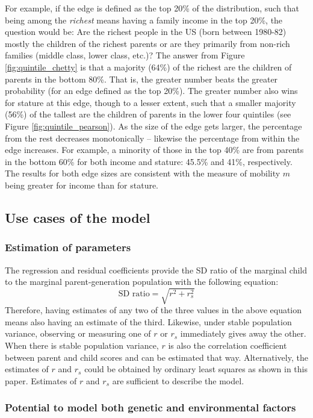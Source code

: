 \documentclass[a4paper,11pt]{article} %
\begin{document}
For example, if the edge is defined as the top 20\% of the distribution, such that being among the \emph{richest} means having a family income in the top 20\%, the question would be: Are the richest people in the US (born between 1980-82) mostly the children of the richest parents or are they primarily from non-rich families (middle class, lower class, etc.)? The answer from Figure \ref{fig:quintile_chetty} is that a majority (64\%) of the richest are the children of parents in the bottom 80\%. That is, the greater number beats the greater probability (for an edge defined as the top 20\%). The greater number also wins for stature at this edge, though to a lesser extent, such that a smaller majority (56\%) of the tallest are the children of parents in the lower four quintiles (see Figure \ref{fig:quintile_pearson}). As the size of the edge gets larger, the percentage from the rest decreases monotonically -- likewise the percentage from within the edge increases. For example, a minority of those in the top 40\% are from parents in the bottom 60\% for both income and stature: 45.5\% and 41\%, respectively. The results for both edge sizes are consistent with the measure of mobility $m$ being greater for income than for stature. 


\subsection{Use cases of the model}

\subsubsection*{Estimation of parameters}
The regression and residual coefficients provide the SD ratio of the marginal child to the marginal parent-generation population with the following equation:
$$\mathrm{SD}\,\, \mathrm{ratio} =  \sqrt{r^2+r_s^2}$$
Therefore, having estimates of any two of the three values in the above equation means also having an estimate of the third. Likewise, under stable population variance, observing or measuring one of $r$ or $r_s$ immediately gives away the other. When there is stable population variance, $r$ is also the correlation coefficient between parent and child scores and can be estimated that way. Alternatively, the estimates of $r$ and $r_s$ could be obtained by ordinary least squares as shown in this paper. Estimates of $r$ and $r_s$ are sufficient to describe the model.

\subsubsection*{Potential to model both genetic and environmental factors}
\end{document}
